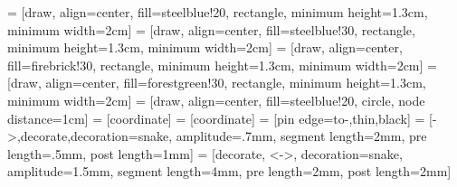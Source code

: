 

\tikzexternalize[%
mode=list and make, %
prefix=pgfplotsfigures/]%








         = [draw, align=center, fill=steelblue!20, rectangle, minimum height=1.3cm, minimum width=2cm]
 = [draw, align=center, fill=steelblue!30, rectangle, minimum height=1.3cm, minimum width=2cm]
   = [draw, align=center, fill=firebrick!30, rectangle, minimum height=1.3cm, minimum width=2cm]
   = [draw, align=center, fill=forestgreen!30, rectangle, minimum height=1.3cm, minimum width=2cm]
 = [draw, align=center, fill=steelblue!20, circle, node distance=1cm]
 = [coordinate]
 = [coordinate]
 = [pin edge={to-,thin,black}]
 = [->,decorate,decoration={snake, amplitude=.7mm, segment
  length=2mm, pre length=.5mm, post length=1mm}]
 = [decorate, <->,
decoration={snake, amplitude=1.5mm, segment length=4mm, pre length=2mm, post
  length=2mm}]




